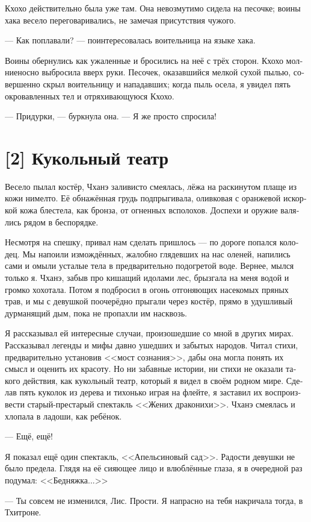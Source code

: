 \documentclass[a4paper,12pt,fleqn]{book}\usepackage{cooltooltips}\usepackage{polyglossia}\setdefaultlanguage[babelshorthands=true]{russian}\setotherlanguage{english}\defaultfontfeatures{Ligatures=TeX,Mapping=tex-text} \usepackage{xcolor}\definecolor{lightgray}{HTML}{bbbbbb}\color{lightgray}\newcommand{\ml}[3]{\textenglish{\textcolor{black}{#3}}}
\begin{document}
{Кхохо действительно была уже там.
Она невозмутимо сидела на песочке;
воины хака весело переговаривались, не замечая присутствия чужого.

--- Как поплавали? --- поинтересовалась воительница на языке хака.

Воины обернулись как ужаленные и бросились на неё с трёх сторон.
Кхохо молниеносно выбросила вверх руки.
Песочек, оказавшийся мелкой сухой пылью, совершенно скрыл воительницу и нападавших;
когда пыль осела, я увидел пять окровавленных тел и отряхивающуюся Кхохо.

--- Придурки, --- буркнула она.
--- Я же просто спросила!

\section{[2] Кукольный театр}

Весело пылал костёр, Чханэ заливисто смеялась, лёжа на раскинутом плаще из кожи нимелто.
Её обнажённая грудь подпрыгивала, оливковая с оранжевой искоркой кожа блестела, как бронза, от огненных всполохов.
Доспехи и оружие валялись рядом в беспорядке.

Несмотря на спешку, привал нам сделать пришлось --- по дороге попался колодец.
Мы напоили измождённых, жалобно глядевших на нас оленей, напились сами и омыли усталые тела в предварительно подогретой воде.
Вернее, мылся только я.
Чханэ, забыв про кишащий идолами лес, брызгала на меня водой и громко хохотала.
Потом я подбросил в огонь отгоняющих насекомых пряных трав, и мы с девушкой поочерёдно прыгали через костёр, прямо в удушливый дурманящий дым, пока не пропахли им насквозь.

Я рассказывал ей интересные случаи, произошедшие со мной в других мирах.
Рассказывал легенды и мифы давно ушедших и забытых народов.
Читал стихи, предварительно установив <<мост сознания>>, дабы она могла понять их смысл и оценить их красоту.
Но ни забавные истории, ни стихи не оказали такого действия, как кукольный театр, который я видел в своём родном мире.
Сделав пять куколок из дерева и тихонько играя на флейте, я заставил их воспроизвести старый-престарый спектакль <<Жених драконихи>>.
Чханэ смеялась и хлопала в ладоши, как ребёнок.

--- Ещё, ещё!

Я показал ещё один спектакль, <<Апельсиновый сад>>.
Радости девушки не было предела.
Глядя на её сияющее лицо и влюблённые глаза, я в очередной раз подумал: <<Бедняжка...>>

--- Ты совсем не изменился, Лис.
Прости.
Я напрасно на тебя накричала тогда, в Тхитроне.

}
\end{document}
